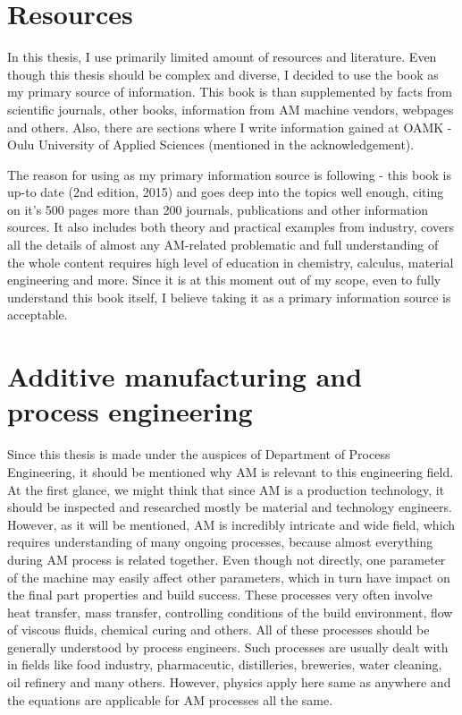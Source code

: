 \documentclass[a4paper, 11pt, reqno]{report}
\begin{document}
\section{Resources}
In this thesis, I use primarily limited amount of resources and literature. Even though this thesis should be complex and diverse, I decided to use the book \cite{AMT} as my primary source of information. This book is than supplemented by facts from scientific journals, other books, information from AM machine vendors, webpages and others. Also, there are sections where I write information gained at OAMK - Oulu University of Applied Sciences (mentioned in the acknowledgement).

	The reason for using \cite{AMT} as my primary information source is following - this book is up-to date (2nd edition, 2015) and goes deep into the topics well enough, citing on it's 500 pages more than 200 journals, publications and other information sources. It also includes both theory and practical examples from industry, covers all the details of almost any AM-related problematic and full understanding of the whole content requires high level of education in chemistry, calculus, material engineering and more. Since it is at this moment out of my scope, even to fully understand this book itself, I believe taking it as a primary information source is acceptable.
%
\section{Additive manufacturing and process engineering}
Since this thesis is made under the auspices of Department of Process Engineering, it should be mentioned why AM is relevant to this engineering field. At the first glance, we might think that since AM is a production technology, it should be inspected and researched mostly be material and technology engineers. However, as it will be mentioned, AM is incredibly intricate and wide field, which requires understanding of many ongoing processes, because almost everything during AM process is related together. Even though not directly, one parameter of the machine may easily affect other parameters, which in turn have impact on the final part properties and build success. These processes very often involve heat transfer, mass transfer, controlling conditions of the build environment, flow of viscous fluids, chemical curing and others. All of these processes should be generally understood by process engineers. Such processes are usually dealt with in fields like food industry, pharmaceutic, distilleries, breweries, water cleaning, oil refinery and many others. However, physics apply here same as anywhere and the equations are applicable for AM processes all the same.
\end{document}
